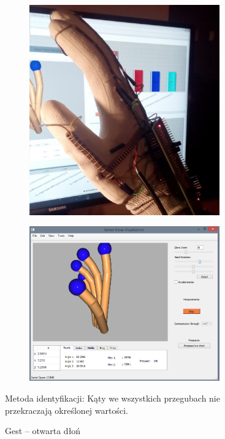 \documentclass[12pt,a4paper]{article}
\begin{document}
\begin{figure}[!htb]
\centering
    \begin{subfigure}{.5\textwidth}
      \includegraphics[width=0.9\textwidth]{./images/Palm.jpg}
     \end{subfigure}%
    \begin{subfigure}{.5\textwidth}
      \includegraphics[width=0.9\textwidth]{./images/PalmQt.png}
     \end{subfigure}
    \caption{Gest -- otwarta dłoń \label{fig:Palm}}
\flushleft Metoda identyfikacji: Kąty we wszystkich przegubach nie przekraczają określonej wartości.
\end{figure}
\end{document}
